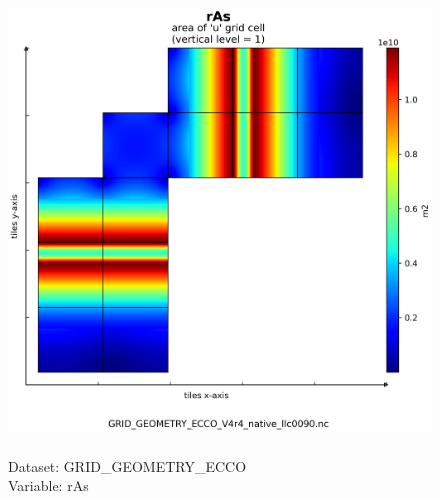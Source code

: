 \begin{figure}[H]
\centering
\includegraphics[scale=0.5]{../images/plots/native_plots_coords/Geometry_Parameters_for_the_Lat-Lon-Cap_90_(llc90)_Native_Model_Grid_(Version_4_Release_4)/rAs.png}
\caption{\\Dataset: GRID\_GEOMETRY\_ECCO\\Variable: rAs}
\label{tab:table-GRID_GEOMETRY_ECCO_rAs-Plot}
\end{figure}
\pagebreak
